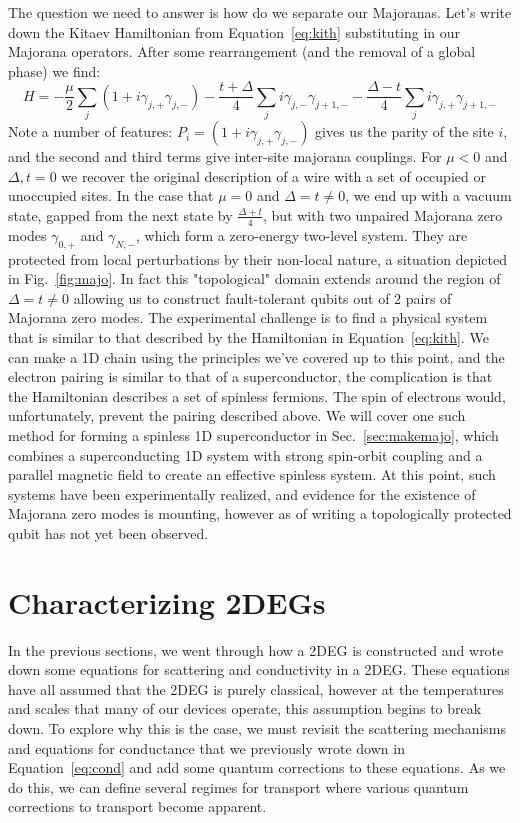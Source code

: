 The question we need to answer is how do we separate our Majoranas. Let's write down the Kitaev Hamiltonian from Equation~\ref{eq:kith}
substituting in our Majorana operators. After some rearrangement (and the removal of a global phase) we find:
\begin{equation}
  H = -\frac{\mu}{2}\sum_j(1 + i\gamma_{j,+}\gamma_{j,-}) - \frac{t + \Delta}{4}\sum_j i \gamma_{j,-}\gamma_{j+1,-} - \frac{\Delta - t}{4}\sum_j i \gamma_{j,+}\gamma_{j+1,-}
\end{equation}
Note a number of features: $P_i = (1 + i\gamma_{j,+}\gamma_{j,-})$ gives us the parity of the site $i$, and the second and third terms give inter-site majorana couplings.
For $\mu < 0$ and $\Delta, t = 0$ we recover the original description of a wire with a set of occupied or unoccupied sites. In the case
that $\mu = 0$ and $\Delta = t \neq 0$, we end up with a vacuum state, gapped from the next state by $\tfrac{\Delta+t}{4}$, but with two unpaired
Majorana zero modes $\gamma_{0,+}$ and $\gamma_{N,-}$, which form a zero-energy two-level system. They are protected from local perturbations
by their non-local nature, a situation depicted in Fig.~\ref{fig:majo}. In fact this "topological" domain extends around the region of $\Delta = t \neq 0$
allowing us to construct fault-tolerant qubits out of 2 pairs of Majorana zero modes\cite{RevModPhys.80.1083}. The experimental challenge is
to find a physical system that is similar to that described by the Hamiltonian in Equation~\ref{eq:kith}. We can make a 1D chain using the principles
we've covered up to this point, and the electron pairing is similar to that of a superconductor, the complication is that the Hamiltonian describes
a set of spinless fermions. The spin of electrons would, unfortunately, prevent the pairing described above. We will cover one such method for forming
a spinless 1D superconductor in Sec.~\ref{sec:makemajo}, which combines a superconducting 1D system with strong spin-orbit coupling and a
parallel magnetic field to create an effective spinless system\cite{PhysRevLett.105.077001,PhysRevLett.105.177002}. At this point, such systems
have been experimentally realized, and evidence for the existence of Majorana zero modes is mounting\cite{Mourik1003,s41578-018-0003-1}, however as of writing
a topologically protected qubit has not yet been observed.

\section{Characterizing 2DEGs}
\label{sec:char}
In the previous sections, we went through how a 2DEG is constructed and wrote down some equations for scattering
and conductivity in a 2DEG. These equations have all assumed that the 2DEG is purely classical, however at the temperatures
and scales that many of our devices operate, this assumption begins to break down. To explore why this is the case,
we must revisit the scattering mechanisms and equations for conductance that we previously wrote down in Equation~\ref{eq:cond}
and add some quantum corrections to these equations. As we do this, we can define several regimes for transport
where various quantum corrections to transport become apparent.

